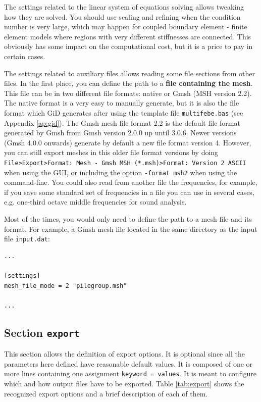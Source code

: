 \documentclass[a4paper,fleqn]{book}
\begin{document}
The settings related to the linear system of equations solving allows tweaking how they are solved. You should use scaling and refining when the condition number is very large, which may happen for coupled boundary element - finite element models where regions with very different stiffnesses are connected. This obviously has some impact on the computational cost, but it is a price to pay in certain cases.

The settings related to auxiliary files allows reading some file sections from other files. In the first place, you can define the path to a \textbf{file containing the mesh}. This file can be in two different file formats: native or Gmsh (MSH version 2.2). The native format is a very easy to manually generate, but it is also the file format which GiD generates after using the template file \texttt{multifebe.bas} (see Appendix \ref{ap:gid}). The Gmsh mesh file format 2.2 is the default file format generated by Gmsh from Gmsh version 2.0.0 up until 3.0.6. Newer versions (Gmsh 4.0.0 onwards) generate by default a new file format version 4. However, you can still export meshes in this older file format versions by doing \texttt{File>Export>Format: Mesh - Gmsh MSH (*.msh)>Format: Version 2 ASCII} when using the GUI, or including the option \texttt{-format msh2} when using the command-line. You could also read from another file the frequencies, for example, if you save some standard set of frequencies in a file you can use in several cases, e.g. one-third octave middle frequencies for sound analysis.

Most of the times, you would only need to define the path to a mesh file and its format. For example, a Gmsh mesh file located in the same directory as the input file \texttt{input.dat}:

\begin{Verbatim}[frame=single, fontsize=\small, label=input.dat]
...

[settings]
mesh_file_mode = 2 "pilegroup.msh"

...
\end{Verbatim} 

\subsection{Section \texttt{export}}

This section allows the definition of export options. It is optional since all the parameters here defined have reasonable default values. It is composed of one or more lines containing one assignment \texttt{keyword = values}. It is meant to configure which and how output files have to be exported. Table \ref{tab:export} shows the recognized export options and a brief description of each of them.
\end{document}
